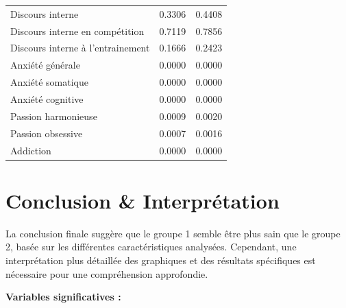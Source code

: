 \documentclass[
]{article}
\begin{document}
\begin{longtable}{lrr}
Discours interne & 0.3306 & 0.4408 \\ 
Discours interne en compétition & 0.7119 & 0.7856 \\ 
Discours interne à l'entrainement & 0.1666 & 0.2423 \\ 
Anxiété générale & 0.0000 & 0.0000 \\ 
Anxiété somatique & 0.0000 & 0.0000 \\ 
Anxiété cognitive & 0.0000 & 0.0000 \\ 
Passion harmonieuse & 0.0009 & 0.0020 \\ 
Passion obsessive & 0.0007 & 0.0016 \\ 
Addiction & 0.0000 & 0.0000 \\ 
\bottomrule
\end{longtable}

\newpage

\hypertarget{conclusion-interpruxe9tation}{%
\section{Conclusion \&
Interprétation}\label{conclusion-interpruxe9tation}}

La conclusion finale suggère que le groupe 1 semble être plus sain que
le groupe 2, basée sur les différentes caractéristiques analysées.
Cependant, une interprétation plus détaillée des graphiques et des
résultats spécifiques est nécessaire pour une compréhension approfondie.

\textbf{Variables significatives :}
\end{document}
